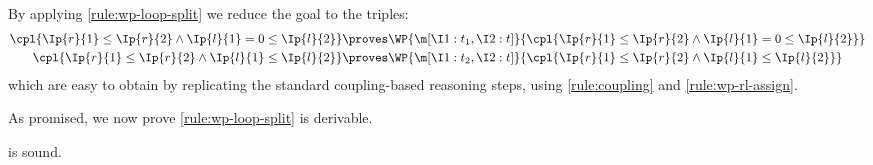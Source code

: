 By applying \ref{rule:wp-loop-split} we reduce the goal to the triples:
\begin{align*}
  \cpl{
    \Ip{r}{1}\leq\Ip{r}{2}
    \land
    \Ip{l}{1}=0\leq\Ip{l}{2}
  }
  &\proves
  \WP{\m[
    \I1: t_1,
    \I2: t
  ]}{
    \cpl{
      \Ip{r}{1}\leq\Ip{r}{2}
      \land
      \Ip{l}{1}=0\leq\Ip{l}{2}
    }
  }
  \\
  \cpl{
    \Ip{r}{1}\leq\Ip{r}{2}
    \land
    \Ip{l}{1}\leq\Ip{l}{2}
  }
  &\proves
  \WP{\m[
    \I1: t_2,
    \I2: t
  ]}{
    \cpl{
      \Ip{r}{1}\leq\Ip{r}{2}
      \land
      \Ip{l}{1}\leq\Ip{l}{2}
    }
  }
\end{align*}
which are easy to obtain by replicating the standard coupling-based reasoning
steps, using \ref{rule:coupling} and \ref{rule:wp-rl-assign}.

\medskip
As promised, we now prove \ref{rule:wp-loop-split} is derivable.
\begin{lemma}
\label{proof:wp-loop-split}
   is sound.
\end{lemma}

